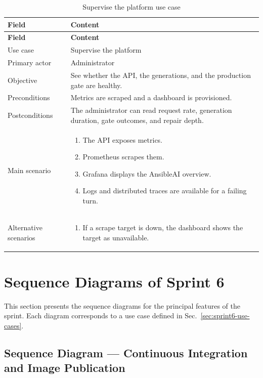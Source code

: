\begingroup
\footnotesize
\renewcommand{\arraystretch}{1.15}
\begin{longtable}{|L{3.2cm}|L{11.6cm}|}
\caption{Supervise the platform use case}
\label{tab:use-case-supervise-platform} \\
\hline
{}
\textbf{Field} & \textbf{Content} \\
\hline
\endfirsthead
\hline
{}
\textbf{Field} & \textbf{Content} \\
\hline
\endhead
Use case & Supervise the platform \\
\hline
Primary actor & Administrator \\
\hline
Objective & See whether the API, the generations, and the production gate are healthy. \\
\hline
Preconditions & Metrics are scraped and a dashboard is provisioned. \\
\hline
Postconditions & The administrator can read request rate, generation duration, gate outcomes, and repair depth. \\
\hline
Main scenario & \begin{enumerate}[leftmargin=1.5em,itemsep=0.1em,topsep=0.2em]
  \item The API exposes metrics.
  \item Prometheus scrapes them.
  \item Grafana displays the AnsibleAI overview.
  \item Logs and distributed traces are available for a failing turn.
\end{enumerate} \\
\hline
Alternative scenarios & \begin{enumerate}[label=A\arabic*.,leftmargin=2em,itemsep=0.1em,topsep=0.2em]
  \item If a scrape target is down, the dashboard shows the target as unavailable.
\end{enumerate} \\
\hline
\end{longtable}
\endgroup

\section{Sequence Diagrams of Sprint 6}

This section presents the sequence diagrams for the principal features of the sprint. Each diagram corresponds to a use case defined in Sec.~\ref{sec:sprint6-use-cases}.

\subsection{Sequence Diagram --- Continuous Integration and Image Publication}

